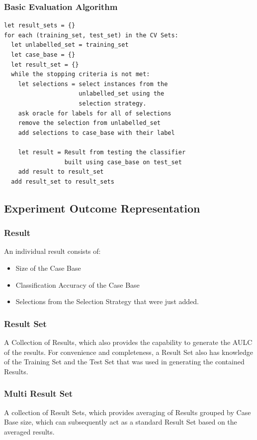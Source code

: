 \documentclass[a4paper,11pt]{report}
\begin{document}
\subsubsection{Basic Evaluation Algorithm}
\begin{samepage}
\begin{verbatim}
let result_sets = {}
for each (training_set, test_set) in the CV Sets:
  let unlabelled_set = training_set
  let case_base = {}
  let result_set = {}
  while the stopping criteria is not met:
    let selections = select instances from the 
                     unlabelled_set using the 
                     selection strategy.
    ask oracle for labels for all of selections
    remove the selection from unlabelled_set
    add selections to case_base with their label
  
    let result = Result from testing the classifier
                 built using case_base on test_set
    add result to result_set
  add result_set to result_sets
\end{verbatim}
\end{samepage}

\subsection{Experiment Outcome Representation}
\subsubsection{Result}
An individual result consists of:
\begin{itemize}
	\item Size of the Case Base
	\item Classification Accuracy of the Case Base
	\item Selections from the Selection Strategy that were just added.
\end{itemize}

\subsubsection{Result Set}
A Collection of Results, which also provides the capability to generate the AULC of the results. For convenience and completeness, a Result Set also has knowledge of the Training Set and the Test Set that was used in generating the contained Results.

\subsubsection{Multi Result Set}
A collection of Result Sets, which provides averaging of Results grouped by Case Base size, which can subsequently act as a standard Result Set based on the averaged results.
\end{document}
